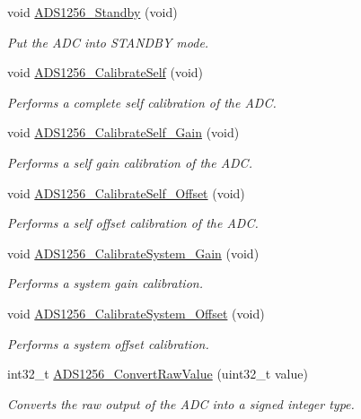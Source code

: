 \begin{DoxyCompactItemize}
void \hyperlink{group__ads1256__driver_ga5a915f192a268c5737f34dcbe2859524}{A\-D\-S1256\-\_\-\-Standby} (void)
\begin{DoxyCompactList}\small\item\em Put the A\-D\-C into S\-T\-A\-N\-D\-B\-Y mode. \end{DoxyCompactList}\item 
void \hyperlink{group__ads1256__driver_ga72de73cf9585121dd65895c6addf16ff}{A\-D\-S1256\-\_\-\-Calibrate\-Self} (void)
\begin{DoxyCompactList}\small\item\em Performs a complete self calibration of the A\-D\-C. \end{DoxyCompactList}\item 
void \hyperlink{group__ads1256__driver_ga96e7231f5e5efc15c39b81b21baf1b95}{A\-D\-S1256\-\_\-\-Calibrate\-Self\-\_\-\-Gain} (void)
\begin{DoxyCompactList}\small\item\em Performs a self gain calibration of the A\-D\-C. \end{DoxyCompactList}\item 
void \hyperlink{group__ads1256__driver_ga16aea61ac77485fb889c960e16b0ed6b}{A\-D\-S1256\-\_\-\-Calibrate\-Self\-\_\-\-Offset} (void)
\begin{DoxyCompactList}\small\item\em Performs a self offset calibration of the A\-D\-C. \end{DoxyCompactList}\item 
void \hyperlink{group__ads1256__driver_ga46a14d9bcba054e6b6db5b4f8f0bf895}{A\-D\-S1256\-\_\-\-Calibrate\-System\-\_\-\-Gain} (void)
\begin{DoxyCompactList}\small\item\em Performs a system gain calibration. \end{DoxyCompactList}\item 
void \hyperlink{group__ads1256__driver_gab49754dd631e07c61fed6c41b18ad88e}{A\-D\-S1256\-\_\-\-Calibrate\-System\-\_\-\-Offset} (void)
\begin{DoxyCompactList}\small\item\em Performs a system offset calibration. \end{DoxyCompactList}\item 
int32\-\_\-t \hyperlink{group__ads1256__driver_gad8605a86bb12367efea3074b97dfa529}{A\-D\-S1256\-\_\-\-Convert\-Raw\-Value} (uint32\-\_\-t value)
\begin{DoxyCompactList}\small\item\em Converts the raw output of the A\-D\-C into a signed integer type. \end{DoxyCompactList}\item 

\end{DoxyCompactItemize}
